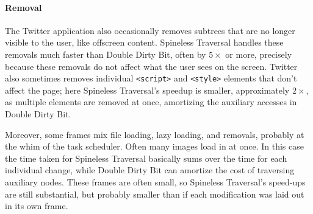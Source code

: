 \paragraph{Removal}
The Twitter application also occasionally removes
  subtrees that are no longer visible to the user,
  like offscreen content.
Spineless Traversal handles these removals
  much faster than Double Dirty Bit,
  often by $5\times$ or more,
  precisely because these removals
  do not affect what the user sees on the screen.
Twitter also sometimes removes
  individual \texttt{<script>} and \texttt{<style>} elements
  that don't affect the page;
  here Spineless Traversal's speedup
  is smaller, approximately $2\times$,
  as multiple elements are removed at once,
  amortizing the auxiliary accesses in Double Dirty Bit. 

Moreover,
  some frames mix file loading, lazy loading, and removals,
  probably at the whim of the task scheduler.
Often many images load in at once.
In this case the time taken for Spineless Traversal 
  basically sums over the time for each individual change,
  while Double Dirty Bit can amortize the cost
  of traversing auxiliary nodes.
These frames are often small,
  so Spineless Traversal's speed-ups are still substantial,
  but probably smaller than if each modification
  was laid out in its own frame.
